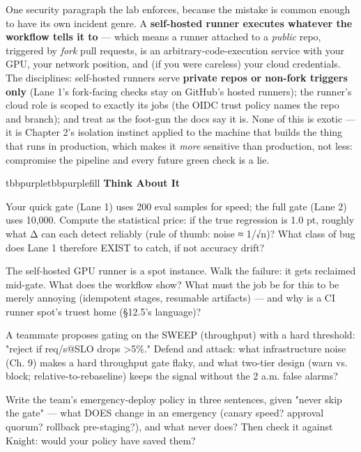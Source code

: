 One security paragraph the lab enforces, because the mistake is common enough to have its own incident genre. A \textbf{self-hosted runner executes whatever the workflow tells it to} — which means a runner attached to a \textit{public} repo, triggered by \textit{fork} pull requests, is an arbitrary-code-execution service with your GPU, your network position, and (if you were careless) your cloud credentials. The disciplines: self-hosted runners serve \textbf{private repos or non-fork triggers only} (Lane 1's fork-facing checks stay on GitHub's hosted runners); the runner's cloud role is scoped to exactly its jobs (the OIDC trust policy names the repo and branch); and treat  as the foot-gun the docs say it is. None of this is exotic — it is Chapter 2's isolation instinct applied to the machine that builds the thing that runs in production, which makes it \textit{more} sensitive than production, not less: compromise the pipeline and every future green check is a lie.

\begin{calloutbox}{tbbpurple}{tbbpurplefill}
{\normalsize\bfseries\color{tbbpurple}Think About It}\par\vspace{3pt}
\begin{tbbitemize}
  \item Your quick gate (Lane 1) uses 200 eval samples for speed; the full gate (Lane 2) uses 10,000. Compute the statistical price: if the true regression is 1.0 pt, roughly what Δ can each detect reliably (rule of thumb: noise ≈ 1/√n)? What class of bug does Lane 1 therefore EXIST to catch, if not accuracy drift?
  \item The self-hosted GPU runner is a spot instance. Walk the failure: it gets reclaimed mid-gate. What does the workflow show? What must the job be for this to be merely annoying (idempotent stages, resumable artifacts) — and why is a CI runner spot's truest home (§12.5's language)?
  \item A teammate proposes gating on the SWEEP (throughput) with a hard threshold: "reject if req/s@SLO drops >5\%." Defend and attack: what infrastructure noise (Ch. 9) makes a hard throughput gate flaky, and what two-tier design (warn vs. block; relative-to-rebaseline) keeps the signal without the 2 a.m. false alarms?
  \item Write the team's emergency-deploy policy in three sentences, given "never skip the gate" — what DOES change in an emergency (canary speed? approval quorum? rollback pre-staging?), and what never does? Then check it against Knight: would your policy have saved them?
\end{tbbitemize}
\end{calloutbox}

